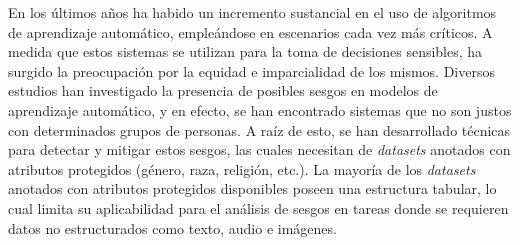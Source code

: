 \begin{resumen}
	

	En los \'ultimos a\~nos ha habido un incremento sustancial en el uso de algoritmos de aprendizaje autom\'atico, emple\'andose en
	escenarios cada vez m\'as cr\'iticos. A medida que estos sistemas se utilizan para la toma de decisiones sensibles, ha surgido 
	la preocupaci\'on por la equidad e imparcialidad de los mismos. Diversos estudios han investigado la presencia de posibles sesgos
    en modelos de aprendizaje autom\'atico, y en efecto, se han encontrado sistemas que no son justos con determinados grupos de personas.
	A ra\'iz de esto, se han desarrollado t\'ecnicas para detectar y mitigar estos sesgos, las cuales necesitan de \emph{datasets} anotados
	con atributos protegidos (g\'enero, raza, religi\'on, etc.). La mayor\'ia de los \emph{datasets} anotados con atributos protegidos disponibles poseen una estructura tabular, lo cual limita su aplicabilidad
	para el an\'alisis de sesgos en tareas donde se requieren datos no estructurados como texto, audio e im\'agenes.
	

\end{resumen}
